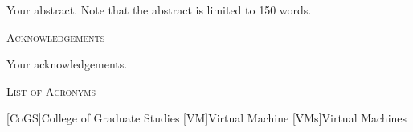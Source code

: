 \documentclass{UIdahoMastersThesis}
\begin{document}
	Your abstract. Note that the abstract is limited to 150 words.
	
	\newpage
	
	
	\begin{center}
		{\LARGE\textsc{Acknowledgements}}
	\end{center}
	
	Your acknowledgements.
	
	\newpage
	
	
	
	
	
	
	\tableofcontents
	\newpage
	
	
	
	
	
	
	
	
	\begin{center}
		{\LARGE\textsc{List of Acronyms}}
	\end{center}
	
	\begin{acronym}[CoGS ]  %
		{College of Graduate Studies}
		[VM]{Virtual Machine}  %
		[VMs]{Virtual Machines}  %
	\end{acronym}
	
\end{document}
